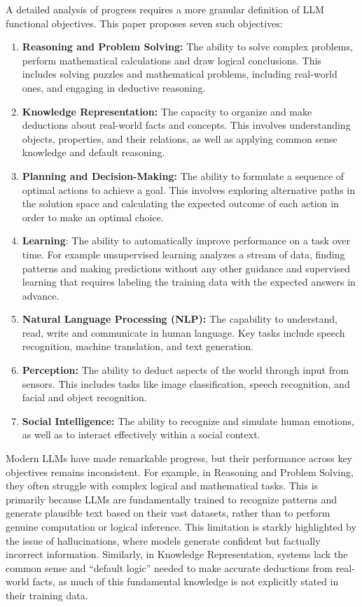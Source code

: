 \documentclass[12pt]{article}
\begin{document}
A detailed analysis of progress requires a more granular definition of LLM functional objectives. This paper proposes seven such objectives:
\begin{enumerate}
    \item \textbf{Reasoning and Problem Solving:} The ability to solve complex problems, perform mathematical calculations and draw logical conclusions. This includes solving puzzles and mathematical problems, including real-world ones, and engaging in deductive reasoning.

    \item \textbf{Knowledge Representation:} The capacity to organize and make deductions about real-world facts and concepts. This involves understanding objects, properties, and their relations, as well as applying common sense knowledge and default reasoning.

    \item \textbf{Planning and Decision-Making:} The ability to formulate a sequence of optimal actions to achieve a goal. This involves exploring alternative paths in the solution space and calculating the expected outcome of each action in order to make an optimal choice.

    \item \textbf{Learning}: The ability to automatically improve performance on a task over time. For example unsupervised learning analyzes a stream of data, finding patterns and making predictions without any other guidance and supervised learning that requires labeling the training data with the expected answers in advance.

     \item \textbf{Natural Language Processing (NLP):}  The capability to understand, read, write and communicate in human language. Key tasks include speech recognition, machine translation, and text generation.

    \item \textbf{Perception:} The ability to deduct aspects of the world through input from sensors. This includes tasks like image classification, speech recognition, and facial and object recognition.

    \item \textbf{Social Intelligence:} The ability to recognize and simulate human emotions, as well as to interact effectively within a social context.
\end{enumerate}
Modern LLMs have made remarkable progress, but their performance across key objectives remains inconsistent. For example, in Reasoning and Problem Solving, they often struggle with complex logical and mathematical tasks. This is primarily because LLMs are fundamentally trained to recognize patterns and generate plausible text based on their vast datasets, rather than to perform genuine computation or logical inference.\cite{inproceedings,Chomsky} This limitation is starkly highlighted by the issue of hallucinations, where models generate confident but factually incorrect information. Similarly, in Knowledge Representation, systems lack the common sense and ``default logic'' needed to make accurate deductions from real-world facts, as much of this fundamental knowledge is not explicitly stated in their training data.\\
\end{document}
